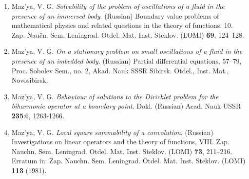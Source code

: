 \documentclass{article}
\begin{document}
\begin{enumerate}
\item Maz'ya, V. G. {\it Solvability of the problem of oscillations of
a
fluid in the presence of an immersed body}.
(Russian) Boundary value problems of mathematical physics and related
questions in the theory of functions, 10. Zap. Nau\v cn. Sem.
Leningrad. Otdel. Mat. Inst. Steklov. (LOMI) {\bf 69}, 124--128.
\item Maz'ya, V. G. {\it On a stationary problem on small oscillations
of a
fluid in the presence of an imbedded body}.
(Russian) Partial differential equations, 57--79, Proc. Sobolev Sem.,
no.
2, Akad. Nauk SSSR Sibirsk. Otdel., Inst. Mat.,
Novosibirsk.
\item Maz'ya, V. G. {\it Behaviour of solutions to the Dirichlet
problem
for the biharmonic operator at a
boundary point}. Dokl. (Russian) Acad. Nauk USSR {\bf 235}:6,
1263-1266.
\item Maz'ya, V. G. {\it Local square summability of a convolution}.
(Russian) Investigations on linear operators
and the theory of functions, VIII. Zap. Nauchn. Sem. Leningrad. Otdel.
Mat.
Inst. Steklov. (LOMI) {\bf 73}, 211--216. Erratum
in:  Zap. Nauchn. Sem. Leningrad. Otdel. Mat. Inst. Steklov. (LOMI)
{\bf
113} (1981).\hfill\break



\end{enumerate}
\end{document}
